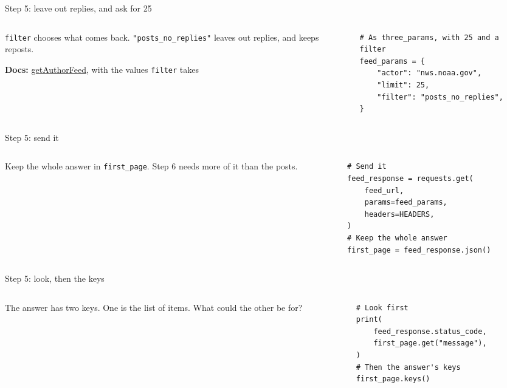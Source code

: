 \documentclass[9pt,aspectratio=169]{beamer}
\begin{document}
\begin{frame}[fragile]{Step 5: leave out replies, and ask for 25}
    \begin{columns}[T]
        \begin{column}{0.37\textwidth}
            \texttt{filter} chooses what comes back. \texttt{"posts\_no\_replies"} leaves out replies, and keeps reposts.

            \medskip
            {\scriptsize\textbf{Docs:} \href{https://endpoints.bsky.app/\#bluesky-app/tag/appbskyfeed/GET/xrpc/app.bsky.feed.getAuthorFeed}{getAuthorFeed}, with the values \texttt{filter} takes\par}
        \end{column}
        \begin{column}{0.6\textwidth}
\begin{lstlisting}
# As three_params, with 25 and a filter
feed_params = {
    "actor": "nws.noaa.gov",
    "limit": 25,
    "filter": "posts_no_replies",
}
\end{lstlisting}
        \end{column}
    \end{columns}
\end{frame}

\begin{frame}[fragile]{Step 5: send it}
    \begin{columns}[T]
        \begin{column}{0.37\textwidth}
            Keep the whole answer in \texttt{first\_page}. Step 6 needs more of it than the posts.
        \end{column}
        \begin{column}{0.6\textwidth}
\begin{lstlisting}
# Send it
feed_response = requests.get(
    feed_url,
    params=feed_params,
    headers=HEADERS,
)
# Keep the whole answer
first_page = feed_response.json()
\end{lstlisting}
        \end{column}
    \end{columns}
\end{frame}

\begin{frame}[fragile]{Step 5: look, then the keys}
    \begin{columns}[T]
        \begin{column}{0.37\textwidth}
            The answer has two keys. One is the list of items. What could the other be for?
        \end{column}
        \begin{column}{0.6\textwidth}
\begin{lstlisting}
# Look first
print(
    feed_response.status_code,
    first_page.get("message"),
)
# Then the answer's keys
first_page.keys()
\end{lstlisting}
        \end{column}
    \end{columns}
\end{frame}
\end{document}

